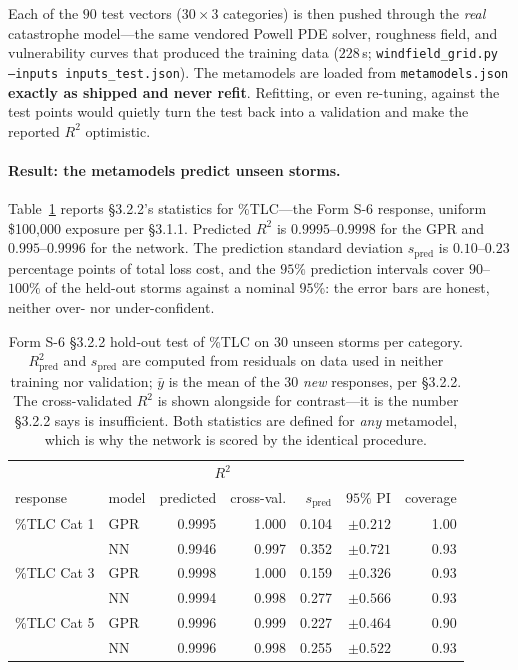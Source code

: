 \documentclass[11pt]{article}
\begin{document}
Each of the $90$ test vectors ($30\times3$ categories) is then pushed through the
\emph{real} catastrophe model---the same vendored Powell PDE solver, roughness field,
and vulnerability curves that produced the training data ($228$\,s;
\texttt{windfield\_grid.py --inputs inputs\_test.json}). The metamodels are loaded from
\texttt{metamodels.json} \textbf{exactly as shipped and never refit}. Refitting, or
even re-tuning, against the test points would quietly turn the test back into a
validation and make the reported $R^2$ optimistic.

\paragraph{Result: the metamodels predict unseen storms.} Table~\ref{tab:holdout}
reports §3.2.2's statistics for \%TLC---the Form S-6 response, uniform \$100{,}000
exposure per §3.1.1. Predicted $R^2$ is $0.9995$--$0.9998$ for the GPR and
$0.995$--$0.9996$ for the network. The prediction standard deviation $s_{\text{pred}}$
is $0.10$--$0.23$ percentage points of total loss cost, and the $95\%$ prediction
intervals cover $90$--$100\%$ of the held-out storms against a nominal $95\%$: the
error bars are honest, neither over- nor under-confident.

\begin{table}[H]
\centering\footnotesize
\caption{Form S-6 §3.2.2 hold-out test of \%TLC on $30$ unseen storms per category.
$R^2_{\text{pred}}$ and $s_{\text{pred}}$ are computed from residuals on data used in
neither training nor validation; $\bar y$ is the mean of the $30$ \emph{new} responses,
per §3.2.2. The cross-validated $R^2$ is shown alongside for contrast---it is the
number §3.2.2 says is insufficient. Both statistics are defined for \emph{any}
metamodel, which is why the network is scored by the identical procedure.}
\label{tab:holdout}
\begin{tabular}{llrrrrr}
\toprule
 & & \multicolumn{2}{c}{$R^2$} & & &\\
\cmidrule(lr){3-4}
response & model & \multicolumn{1}{c}{predicted} & \multicolumn{1}{c}{cross-val.}
 & $s_{\text{pred}}$ & $95\%$ PI & coverage\\
\midrule
\%TLC Cat 1 & GPR & 0.9995 & 1.000 & 0.104 & $\pm0.212$ & 1.00\\
            & NN  & 0.9946 & 0.997 & 0.352 & $\pm0.721$ & 0.93\\
\%TLC Cat 3 & GPR & 0.9998 & 1.000 & 0.159 & $\pm0.326$ & 0.93\\
            & NN  & 0.9994 & 0.998 & 0.277 & $\pm0.566$ & 0.93\\
\%TLC Cat 5 & GPR & 0.9996 & 0.999 & 0.227 & $\pm0.464$ & 0.90\\
            & NN  & 0.9996 & 0.998 & 0.255 & $\pm0.522$ & 0.93\\
\bottomrule
\end{tabular}
\end{table}
\end{document}
